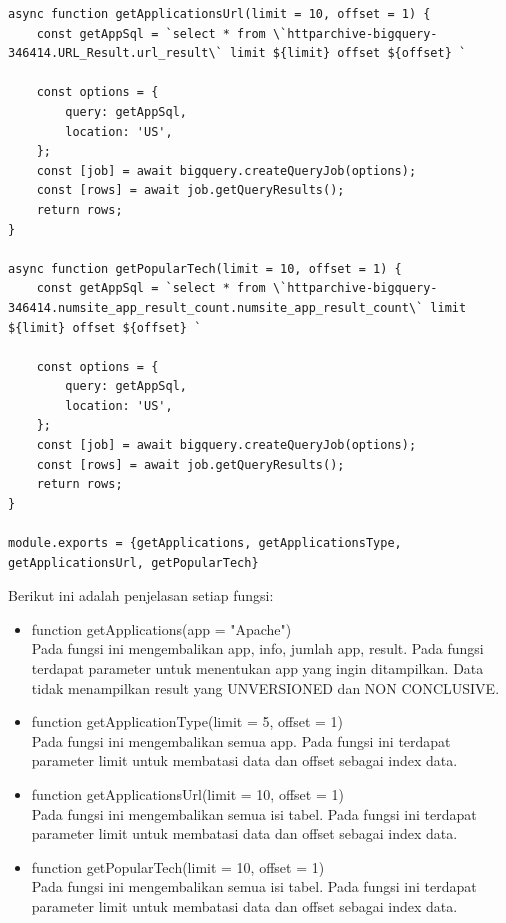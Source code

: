 \begin{enumerate}
\begin{lstlisting}[label={lst:b}, caption={Media untuk Komunikasi dengan BigQuery}]
async function getApplicationsUrl(limit = 10, offset = 1) {
	const getAppSql = `select * from \`httparchive-bigquery-346414.URL_Result.url_result\` limit ${limit} offset ${offset} `
	
	const options = {
		query: getAppSql,
		location: 'US',
	};
	const [job] = await bigquery.createQueryJob(options);
	const [rows] = await job.getQueryResults();
	return rows;
}

async function getPopularTech(limit = 10, offset = 1) {
	const getAppSql = `select * from \`httparchive-bigquery-346414.numsite_app_result_count.numsite_app_result_count\` limit ${limit} offset ${offset} `
	
	const options = {
		query: getAppSql,
		location: 'US',
	};
	const [job] = await bigquery.createQueryJob(options);
	const [rows] = await job.getQueryResults();
	return rows;
}

module.exports = {getApplications, getApplicationsType, getApplicationsUrl, getPopularTech}
	\end{lstlisting}
	Berikut ini adalah penjelasan setiap fungsi:
	\begin{itemize}
		\item function getApplications(app = "Apache")\\
		Pada fungsi ini mengembalikan app, info, jumlah app, result. Pada fungsi terdapat parameter untuk menentukan app yang ingin ditampilkan. Data tidak menampilkan result yang UNVERSIONED dan NON CONCLUSIVE.
		
		\item function getApplicationType(limit = 5, offset = 1)\\
		Pada fungsi ini mengembalikan semua app. Pada fungsi ini terdapat parameter limit untuk membatasi data dan offset sebagai index data.
		
		\item function getApplicationsUrl(limit = 10, offset = 1)\\
		Pada fungsi ini mengembalikan semua isi tabel. Pada fungsi ini terdapat parameter limit untuk membatasi data dan offset sebagai index data.
		
		\item function getPopularTech(limit = 10, offset = 1)\\
		Pada fungsi ini mengembalikan semua isi tabel. Pada fungsi ini terdapat parameter limit untuk membatasi data dan offset sebagai index data.
		
	\end{itemize}


\end{enumerate}
